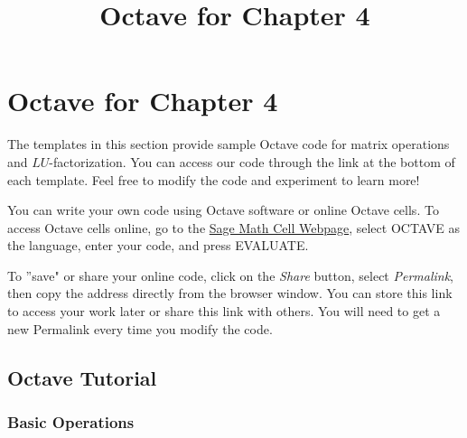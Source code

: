 \documentclass{ximera}
\title{Octave for Chapter 4} \license{CC BY-NC-SA 4.0}
\begin{document}
\begin{abstract}
\end{abstract}
\maketitle

\section*{Octave for Chapter 4}
The templates in this section provide sample Octave code for matrix operations and $LU$-factorization. You can access our code through the link at the bottom of each template.  Feel free to modify the code and experiment to learn more!  

You can write your own code using Octave software or online Octave cells.  To access Octave cells online, go to the \href{https://sagecell.sagemath.org/}{Sage Math Cell Webpage}, select OCTAVE as the language, enter your code, and press EVALUATE.  

To ''save" or share your online code, click on the \emph{Share} button, select \emph{Permalink}, then copy the address directly from the browser window.  You can store this link to access your work later or share this link with others.  You will need to get a new Permalink every time you modify the code.

\subsection*{Octave Tutorial}
\subsubsection*{Basic Operations}
\end{document}
